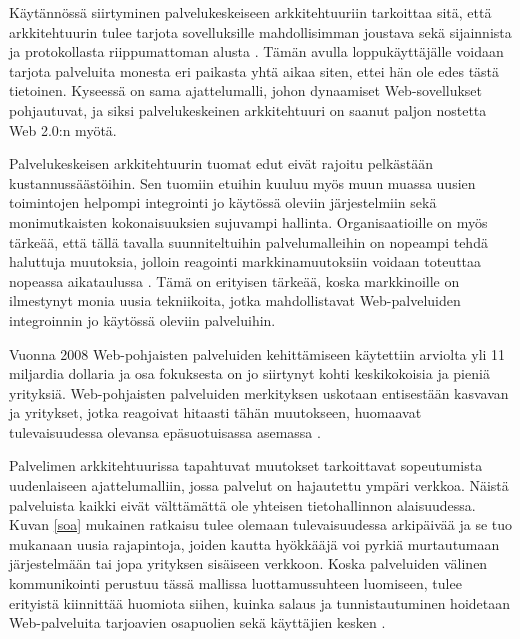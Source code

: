 Käytännössä siirtyminen palvelukeskeiseen arkkitehtuuriin tarkoittaa sitä, että arkkitehtuurin
tulee tarjota sovelluksille mahdollisimman joustava sekä sijainnista ja
protokollasta riippumattoman alusta \cite{SOA}. Tämän avulla loppukäyttäjälle
voidaan tarjota palveluita monesta eri paikasta yhtä aikaa siten, ettei hän ole
edes tästä tietoinen. Kyseessä on sama ajattelumalli, johon dynaamiset Web-sovellukset
pohjautuvat, ja siksi palvelukeskeinen arkkitehtuuri on saanut paljon
nostetta Web 2.0:n myötä.

Palvelukeskeisen arkkitehtuurin tuomat edut eivät rajoitu pelkästään
kustannussäästöihin. Sen tuomiin etuihin kuuluu myös muun muassa uu\-si\-en toimintojen
helpompi integrointi jo käytössä oleviin järjestelmiin sekä monimutkaisten
kokonaisuuksien sujuvampi hallinta. Organisaatioille on myös tärkeää, että tällä
tavalla suunniteltuihin palvelumalleihin on nopeampi tehdä haluttuja muutoksia, jolloin 
reagointi markkinamuutoksiin voidaan toteuttaa nopeassa aikataulussa \cite{WEB2c}. Tämä on
erityisen tärkeää, koska markkinoille on ilmestynyt monia uusia tekniikoita,
jotka mahdollistavat Web-palveluiden integroinnin jo käytössä oleviin
palveluihin.

Vuonna 2008 Web-pohjaisten palveluiden kehittämiseen
käytettiin arviolta yli 11 miljardia dollaria ja osa fokuksesta on jo siirtynyt
kohti keskikokoisia ja pieniä yrityksiä. Web-pohjaisten palveluiden merkityksen
uskotaan entisestään kasvavan ja yritykset, jotka reagoivat hitaasti tähän
muutokseen, huomaavat tulevaisuudessa olevansa epäsuotuisassa asemassa \cite{WEB2b}.

Palvelimen arkkitehtuurissa tapahtuvat muutokset tarkoittavat sopeutumista uudenlaiseen
ajattelumalliin, jossa palvelut on hajautettu ympäri verkkoa. Näistä palveluista kaikki
eivät välttämättä ole yhteisen tietohallinnon alaisuudessa. Kuvan \ref{soa} mukainen ratkaisu
tulee olemaan tulevaisuudessa arkipäivää ja se tuo mukanaan uusia rajapintoja,
joiden kautta hyökkääjä voi pyrkiä murtautumaan järjestelmään tai jopa
yrityksen sisäiseen verkkoon. Koska palveluiden välinen kommunikointi perustuu
tässä mallissa luottamussuhteen luomiseen, tulee erityistä kiinnittää huomiota
siihen, kuinka salaus ja tunnistautuminen hoidetaan Web-palveluita tarjoavien
osapuolien sekä käyttäjien kesken \cite{WEB2b}.

